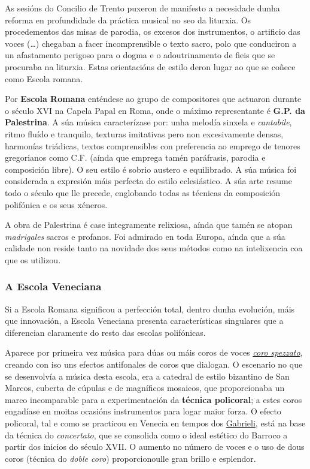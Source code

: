 \begin{multicols}{2}

As sesións do Concilio de Trento puxeron de manifesto a necesidade dunha reforma en profundidade da práctica musical no seo da liturxia. Os procedementos das misas de parodia, os excesos dos instrumentos, o artificio das voces (\ldots) chegaban a facer incomprensible o texto sacro, polo que conduciron a un afastamento perigoso para o dogma e o adoutrinamento de fieis que se procuraba na liturxia. Estas orientacións de estilo deron lugar ao que se coñece como Escola romana.

Por \textbf{Escola Romana} enténdese ao grupo de compositores que actuaron durante o século XVI na Capela Papal en Roma, onde o máximo representante é \textbf{G.P. da Palestrina}. A súa música caracterízase por: unha melodía sinxela e \emph{cantabile}, ritmo fluído e tranquilo, texturas imitativas pero non excesivamente densas, harmonías triádicas, textos comprensibles con preferencia ao emprego de tenores gregorianos como C.F. (aínda que emprega tamén paráfrasis, parodia e composición libre). O seu estilo é sobrio austero e equilibrado. A súa música foi considerada a expresión máis perfecta do estilo eclesiástico. A súa arte resume todo o século que lle precede, englobando todas as técnicas da composición polifónica e os seus xéneros.

A obra de Palestrina é case integramente relixiosa, aínda que tamén se  atopan \emph{madrigales} sacros e profanos. Foi admirado en toda Europa, aínda que a súa calidade non reside tanto na novidade dos seus métodos como na intelixencia coa que os utilizou.

\subsubsection*{A Escola Veneciana}

Si a Escola Romana significou a perfección total, dentro dunha evolución, máis que innovación, a Escola Veneciana presenta características singulares que a diferencian claramente do resto das escolas polifónicas.

Aparece por primeira vez música para dúas ou máis coros de voces \href{http://es.wikipedia.org/wiki/Estilo_policoral_veneciano}{\emph{coro spezzato}},  creando con iso uns efectos antifonales de coros que dialogan. O escenario no que se desenvolvía a música desta escola, era a catedral de estilo bizantino de San Marcos, cuberta de cúpulas e de magníficos mosaicos, que proporcionaba un marco incomparable para a experimentación da \textbf{técnica policoral}; a estes coros engadíase en moitas ocasións instrumentos para logar maior forza. O efecto policoral, tal e como se practicou en Venecia en tempos dos \href{http://open.spotify.com/track/6r9zLucRqaSSyV4XS4t7HL}{Gabrieli}, está na base da técnica do \emph{concertato}, que se consolida como o ideal estético do Barroco a partir dos inicios do século XVII. O aumento no número de voces e o uso de dous coros (técnica do \emph{doble coro}) proporcionoulle gran brillo e esplendor.


\end{multicols}
